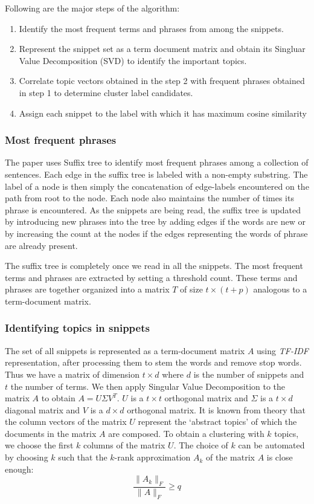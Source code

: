 \documentclass[a4paper,12pt]{report}
\begin{document}
Following are the major steps of the algorithm:
\begin{enumerate}
  \item Identify the most frequent terms and phrases from among the
    snippets. 
  \item Represent the snippet set as a term document matrix and obtain
    its Singluar Value Decomposition (SVD) to identify the important
    topics. 
  \item Correlate topic vectors obtained in the step 2 with frequent
    phrases obtained in step 1 to determine cluster label candidates.
  \item Assign each snippet to the label with which it has maximum
    cosine similarity
\end{enumerate}

\subsubsection{Most frequent phrases}

The paper \cite{Zamir} uses Suffix tree to identify most frequent
phrases among a collection of sentences. Each edge in the suffix tree
is labeled with a non-empty substring. The label of a node is then
simply the concatenation of edge-labels encountered on the path from
root to the node. Each node also maintains the number of times its
phrase is encountered. As the snippets are being read, the suffix tree is
updated by introducing new phrases into the tree by adding edges if
the words are new or by increasing the count at the nodes if the edges
representing the words of phrase are already present. 

The suffix tree is completely once we read in all the snippets. The
most frequent terms and phrases are extracted by setting a threshold
count. These terms and phrases are together organized into a matrix
$T$ of size $t \times (t+p)$ analogous to a term-document matrix.

\subsubsection{Identifying topics in snippets}

The set of all snippets is represented as a term-document matrix $A$
using {\it TF-IDF} representation, after processing them to stem the words
and remove stop words. Thus we have a matrix of dimension $t \times d$
where $d$ is the number of snippets and $t$ the number of terms. We
then apply Singular Value Decomposition to the matrix $A$ to obtain $A
= U \Sigma V^T$. $U$ is a $t \times t$ orthogonal matrix and $\Sigma$
is a $t \times d$ diagonal matrix and $V$ is a $d \times d$ orthogonal
matrix. It is known from theory that the column vectors of the matrix
$U$ represent the `abstract topics' of which the documents in the
matrix $A$ are composed. To obtain a clustering with $k$ topics, we
choose the first $k$ columns of the matrix $U$. The choice of $k$ can
be automated by choosing $k$ such that the $k$-rank approximation
$A_k$ of the matrix $A$ is close enough:
$$
\frac{\|A_k\|_F}{\|A\|_F} \ge q
$$
\end{document}

